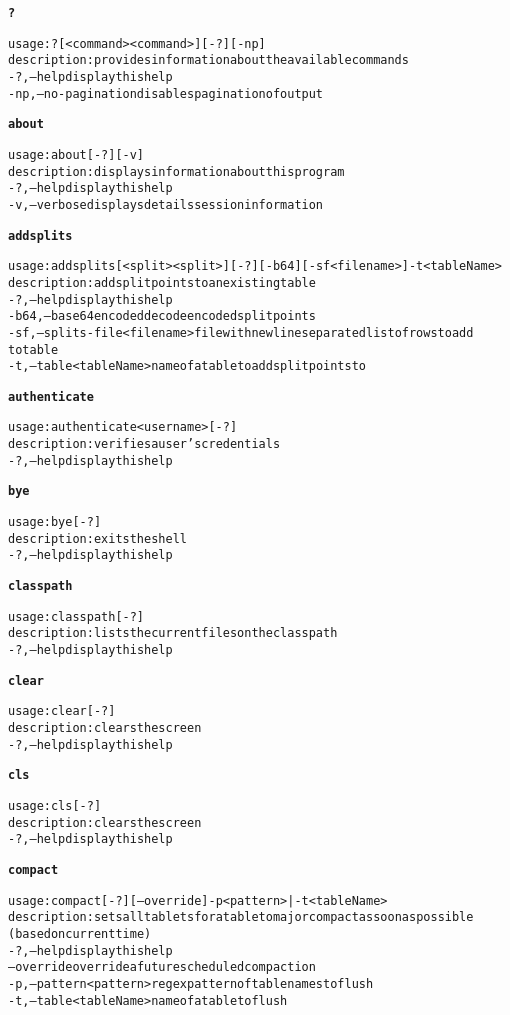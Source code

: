 \begin{alltt}
\textbf{?}

    usage: ? [ <command>{ <command>} ] [-?] [-np]
    description: provides information about the available commands
      -?,--help  display this help
      -np,--no-pagination  disables pagination of output

\textbf{about}

    usage: about [-?] [-v]
    description: displays information about this program
      -?,--help  display this help
      -v,--verbose	displays details session information

\textbf{addsplits}

    usage: addsplits [<split>{ <split>} ] [-?] [-b64] [-sf <filename>] -t <tableName>
    description: add split points to an existing table
      -?,--help  display this help
      -b64,--base64encoded	decode encoded split points
      -sf,--splits-file <filename>	file with newline separated list of rows to add
    	      to table
      -t,--table <tableName>  name of a table to add split points to

\textbf{authenticate}

    usage: authenticate <username> [-?]
    description: verifies a user's credentials
      -?,--help  display this help

\textbf{bye}

    usage: bye [-?]
    description: exits the shell
      -?,--help  display this help

\textbf{classpath}

    usage: classpath [-?]
    description: lists the current files on the classpath
      -?,--help  display this help

\textbf{clear}

    usage: clear [-?]
    description: clears the screen
      -?,--help  display this help

\textbf{cls}

    usage: cls [-?]
    description: clears the screen
      -?,--help  display this help

\textbf{compact}

    usage: compact [-?] [--override] -p <pattern> | -t <tableName>
    description: sets all tablets for a table to major compact as soon as possible
    	      (based on current time)
      -?,--help  display this help
      --override  override a future scheduled compaction
      -p,--pattern <pattern>  regex pattern of table names to flush
      -t,--table <tableName>  name of a table to flush


\end{alltt}
